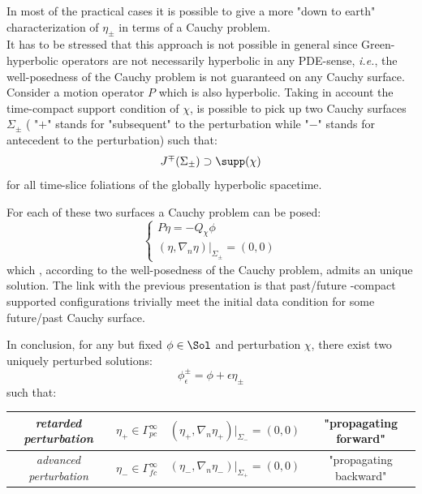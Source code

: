 \documentclass[Main]{subfiles}
\begin{document}
		\vspace{2mm}
			In most of the practical cases it is possible to give a more "down to earth" characterization of $\eta_\pm$ in terms of a Cauchy problem.\\
			It has to be stressed that this approach is not possible in general since Green-hyperbolic operators are not necessarily hyperbolic in any PDE-sense, \textit{i.e.}, the well-posedness of the Cauchy problem is not guaranteed on any Cauchy surface. \cite[pag 1]{Bar} \cite[remark 3.18]{Bar2010}\cite[remark 2.1]{Khavkine2014}
			\\
		Consider a motion operator $P$ which is also hyperbolic.
		Taking in account the time-compact support condition of $\chi$, is possible to pick up  two Cauchy surfaces $\Sigma_\pm$ ( "$+$" stands for "subsequent" to the perturbation while "$-$" stands for antecedent to the perturbation) such that:
		\begin{displaymath}
			J^\mp (\Sigma_\pm) \supset \supp(\chi) 
		\end{displaymath}
		for all time-slice foliations of the globally hyperbolic spacetime.

		For each of these two surfaces a Cauchy problem can be posed:
		\begin{equation}\label{PerturbationCauchyProblem}
		   \begin{cases}
			   P \eta = - Q_\chi \phi \\
			   (\eta, \nabla_n \eta ) \big \vert_{\Sigma_{\pm}} = (0,0)
   			\end{cases}
   		\end{equation}
   		which , according to the well-posedness of the Cauchy problem, admits an unique solution.
   		The link with the previous presentation is that past/future -compact supported configurations trivially meet the initial data condition for some future/past Cauchy surface.
		
		\vspace{2mm}
		In conclusion, for any but fixed $\phi\in \Sol$ and perturbation $\chi$, there exist two uniquely perturbed solutions:
   		\begin{equation}\label{PerturbedSolution}
   			\phi^\pm_\epsilon = \phi + \epsilon \eta_\pm
   		\end{equation}
   		such that:
 		\begin{center}   \begin{tabular}{|c|c|c|c|}
   		\hline
  	 		\emph{retarded perturbation} & $\eta_+ \in \Gamma^\infty_{pc}$ & $(\eta_+, \nabla_n \eta_+ ) \big \vert_{\Sigma_{-}} = (0,0)$ & "propagating forward" \\
  	 		\hline
   			\emph{advanced perturbation} &$\eta_- \in \Gamma^\infty_{fc}$ & $(\eta_-, \nabla_n \eta_- ) \big \vert_{\Sigma_{+}} = (0,0)$ & "propagating backward" \\
   			\hline
   		\end{tabular}	\end{center} 	
		
\end{document}
